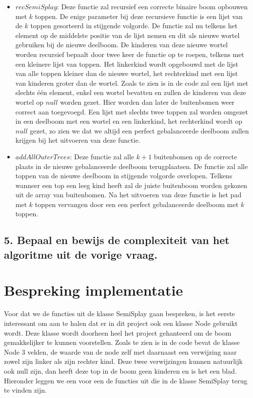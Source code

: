 \documentclass[dutch, 11pt]{report}
\begin{document}
\begin{itemize}
	\item $recSemiSplay$: Deze functie zal recursief een correcte binaire boom opbouwen met $k$ toppen. De enige parameter bij deze recursieve functie is een lijst van de $k$ toppen gesorteerd in stijgende volgorde. De functie zal nu telkens het element op de middelste positie van de lijst nemen en dit als nieuwe wortel gebruiken bij de nieuwe deelboom. De kinderen van deze nieuwe wortel worden recursief bepaalt door twee keer de functie op te roepen, telkens met een kleinere lijst van toppen. Het linkerkind wordt opgebouwd met de lijst van alle toppen kleiner dan de nieuwe wortel, het rechterkind met een lijst van kinderen groter dan de wortel. Zoals te zien is in de code zal een lijst met slechts één element, enkel een wortel bevatten en zullen de kinderen van deze wortel op $null$ worden gezet. Hier worden dan later de buitenbomen weer correct aan toegevoegd. Een lijst met slechts twee toppen zal worden omgezet in een deelboom met een wortel en een linkerkind, het rechterkind wordt op $null$ gezet, zo zien we dat we altijd een perfect gebalanceerde deelboom zullen krijgen bij het uitvoeren van deze functie.
	\item $addAllOuterTrees$: Deze functie zal alle $k+1$ buitenbomen op de correcte plaats in de nieuwe gebalanceerde deelboom terugplaatsen. De functie zal alle toppen van de nieuwe deelboom in stijgende volgorde overlopen. Telkens wanneer een top een leeg kind heeft zal de juiste buitenboom worden gekozen uit de array van buitenbomen. Na het uitvoeren van deze functie is het pad met $k$ toppen vervangen door een een perfect gebalanceerde deelboom met $k$ toppen.
\end{itemize}

\subsection*{5. Bepaal en bewijs de complexiteit van het algoritme uit de vorige vraag.}


\newpage
\section*{Bespreking implementatie}
Voor dat we de functies uit de klasse SemiSplay gaan bespreken, is het eerste interessant om aan te halen dat er in dit project ook een klasse Node gebruikt wordt. Deze klasse wordt doorheen heel het project gehanteerd om de boom gemakkelijker te kunnen voorstellen. Zoals te zien is in de code bevat de klasse Node 3 velden, de waarde van de node zelf met daarnaast een verwijzing naar zowel zijn linker als zijn rechter kind. Deze twee verwijzingen kunnen natuurlijk ook null zijn, dan heeft deze top in de boom geen kinderen en is het een blad. Hieronder leggen we een voor een de functies uit die in de klasse SemiSplay terug te vinden zijn.
\end{document}

